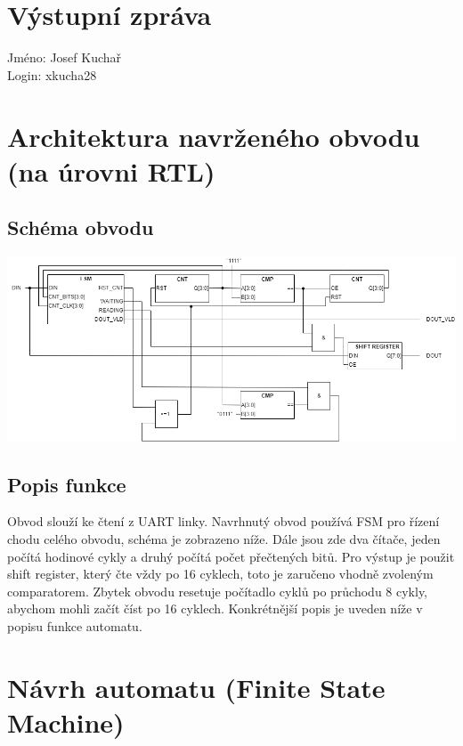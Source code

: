 \documentclass[11pt,a4paper,oneside]{article}
\begin{document}
\section*{\huge{Výstupní zpráva}}
Jméno: Josef Kuchař \\
Login: xkucha28
\section*{Architektura navrženého obvodu (na úrovni RTL)}
\subsection*{Schéma obvodu}
\includegraphics[width=\textwidth,height=\textheight,keepaspectratio]{schema}
\subsection*{Popis funkce}
Obvod slouží ke čtení z UART linky. Navrhnutý obvod používá FSM pro řízení chodu celého obvodu, schéma je zobrazeno níže.
Dále jsou zde dva čítače, jeden počítá hodinové cykly a druhý počítá počet přečtených bitů.
Pro výstup je použit shift register, který čte vždy po 16 cyklech, toto je zaručeno vhodně zvoleným comparatorem.
Zbytek obvodu resetuje počítadlo cyklů po průchodu 8 cykly, abychom mohli začít číst po 16 cyklech.
Konkrétnější popis je uveden níže v popisu funkce automatu.
\newpage
\section*{Návrh automatu (Finite State Machine)}
\end{document}
